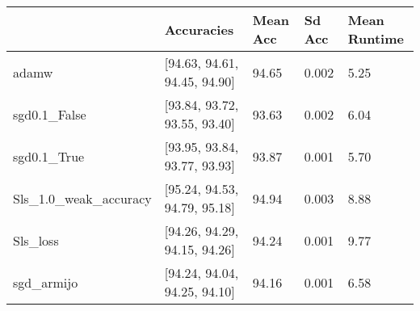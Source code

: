 \begin{tabular}{lllll}
\toprule
{} &                    Accuracies & Mean Acc & Sd Acc & Mean Runtime \\
\midrule
adamw                 &  [94.63, 94.61, 94.45, 94.90] &    94.65 &  0.002 &         5.25 \\
sgd0.1\_False          &  [93.84, 93.72, 93.55, 93.40] &    93.63 &  0.002 &         6.04 \\
sgd0.1\_True           &  [93.95, 93.84, 93.77, 93.93] &    93.87 &  0.001 &         5.70 \\
Sls\_1.0\_weak\_accuracy &  [95.24, 94.53, 94.79, 95.18] &    94.94 &  0.003 &         8.88 \\
Sls\_loss              &  [94.26, 94.29, 94.15, 94.26] &    94.24 &  0.001 &         9.77 \\
sgd\_armijo            &  [94.24, 94.04, 94.25, 94.10] &    94.16 &  0.001 &         6.58 \\
\bottomrule
\end{tabular}
